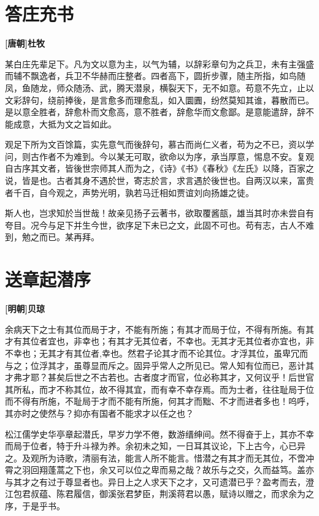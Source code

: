 \documentclass[UTF8,titlepage,oneside]{ctexbook}
\begin{document}
\chapter*{答庄充书}
\begin{center}
	\textbf{[唐朝]杜牧}
\end{center}

某白庄先辈足下。凡为文以意为主，以气为辅，以辞彩章句为之兵卫，未有主强盛而辅不飘逸者，兵卫不华赫而庄整者。四者高下，圆折步骤，随主所指，如鸟随凤，鱼随龙，师众随汤、武，腾天潜泉，横裂天下，无不如意。苟意不先立，止以文彩辞句，绕前捧後，是言愈多而理愈乱，如入圜圚，纷然莫知其谁，暮散而已。是以意全胜者，辞愈朴而文愈高，意不胜者，辞愈华而文愈鄙。是意能遣辞，辞不能成意，大抵为文之旨如此。

观足下所为文百馀篇，实先意气而後辞句，慕古而尚仁义者，苟为之不已，资以学问，则古作者不为难到。今以某无可取，欲命以为序，承当厚意，惕息不安。复观自古序其文者，皆後世宗师其人而为之，《诗》《书》《春秋》《左氏》以降，百家之说，皆是也。古者其身不遇於世，寄志於言，求言遇於後世也。自两汉以来，富贵者千百，自今观之，声势光明，孰若马迁相如贾谊刘向扬雄之徒。

斯人也，岂求知於当世哉！故亲见扬子云著书，欲取覆酱瓿，雄当其时亦未尝自有夸目。况今与足下并生今世，欲序足下未已之文，此固不可也。苟有志，古人不难到，勉之而已。某再拜。


\chapter*{送章起潜序}
\begin{center}
	\textbf{[明朝]贝琼}
\end{center}

余病天下之士有其位而局于才，不能有所施；有其才而局于位，不得有所施。有其才有其位者宜也，非幸也；有其才无其位者，不幸也。无其才无其位者亦宜也，非不幸也；无其才有其位者,幸也。然君子论其才而不论其位。才浮其位，虽卑冗而与之；位浮其才，虽尊显而斥之。固异乎常人之所见已。常人知有位而已，恶计其才弗才耶？甚矣后世之不古若也。古者度才而官，位必称其才，又何议乎！后世官其所私，而才不称其位，故不得其宜，而有幸不幸存焉。而为士者，往往耻局于位而不得有所施，不耻局于才而不能有所施，何其才而黜、不才而进者多也！呜呼，其亦时之使然与？抑亦有国者不能求才以任之也？

松江儒学史华亭章起潜氏，早岁力学不倦，数游缙绅间。然不得奋于上，其亦不幸而局于位者，特于升斗禄为养。余初未之知，一日耳其议论，下上古今，心已异之。及观所为诗歌，清丽有法，能言人所不能言。惜潜之有其才而无其位，不啻冲霄之羽回翔蓬蒿之下也，余又可以位之卑而易之哉？故乐与之交，久而益笃。盖亦与其才之有过于尊显者也。异日上之人求天下之才，又可遗潜已乎？盈考而去，澄江包君叔蕴、陈君履信，御溪张君梦臣，荆溪蒋君以愚，赋诗以赠之，而求余为之序，于是乎书。
\end{document}
